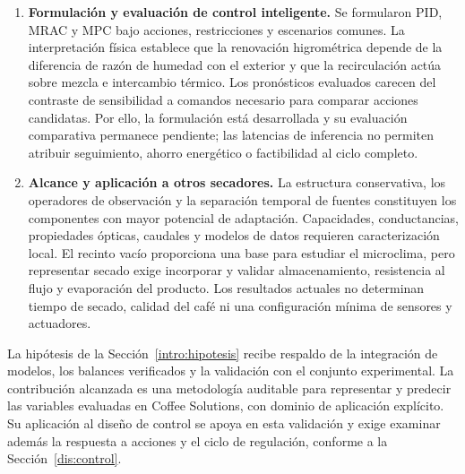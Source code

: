 \begin{enumerate}
\item \textbf{Formulación y evaluación de control inteligente.} Se formularon PID, MRAC y MPC bajo acciones, restricciones y escenarios comunes. La interpretación física establece que la renovación higrométrica depende de la diferencia de razón de humedad con el exterior y que la recirculación actúa sobre mezcla e intercambio térmico. Los pronósticos evaluados carecen del contraste de sensibilidad a comandos necesario para comparar acciones candidatas. Por ello, la formulación está desarrollada y su evaluación comparativa permanece pendiente; las latencias de inferencia no permiten atribuir seguimiento, ahorro energético o factibilidad al ciclo completo.

\item \textbf{Alcance y aplicación a otros secadores.} La estructura conservativa, los operadores de observación y la separación temporal de fuentes constituyen los componentes con mayor potencial de adaptación. Capacidades, conductancias, propiedades ópticas, caudales y modelos de datos requieren caracterización local. El recinto vacío proporciona una base para estudiar el microclima, pero representar secado exige incorporar y validar almacenamiento, resistencia al flujo y evaporación del producto. Los resultados actuales no determinan tiempo de secado, calidad del café ni una configuración mínima de sensores y actuadores.
\end{enumerate}

La hipótesis de la Sección~\ref{intro:hipotesis} recibe respaldo de la integración de modelos, los balances verificados y la validación con el conjunto experimental. La contribución alcanzada es una metodología auditable para representar y predecir las variables evaluadas en Coffee Solutions, con dominio de aplicación explícito. Su aplicación al diseño de control se apoya en esta validación y exige examinar además la respuesta a acciones y el ciclo de regulación, conforme a la Sección~\ref{dis:control}.
